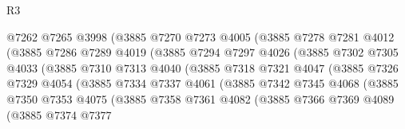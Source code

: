 \begin{lexlean}{R3}
\begin{coremodule}
                          @7262
                          @7265
                          @3998
                          (@3885
                            @7270
                            @7273
                            @4005
                            (@3885
                              @7278
                              @7281
                              @4012
                              (@3885
                                @7286
                                @7289
                                @4019
                                (@3885
                                  @7294
                                  @7297
                                  @4026
                                  (@3885
                                    @7302
                                    @7305
                                    @4033
                                    (@3885
                                      @7310
                                      @7313
                                      @4040
                                      (@3885
                                        @7318
                                        @7321
                                        @4047
                                        (@3885
                                          @7326
                                          @7329
                                          @4054
                                          (@3885
                                            @7334
                                            @7337
                                            @4061
                                            (@3885
                                              @7342
                                              @7345
                                              @4068
                                              (@3885
                                                @7350
                                                @7353
                                                @4075
                                                (@3885
                                                  @7358
                                                  @7361
                                                  @4082
                                                  (@3885
                                                    @7366
                                                    @7369
                                                    @4089
                                                    (@3885
                                                      @7374
                                                      @7377

\end{coremodule}
\end{lexlean}
